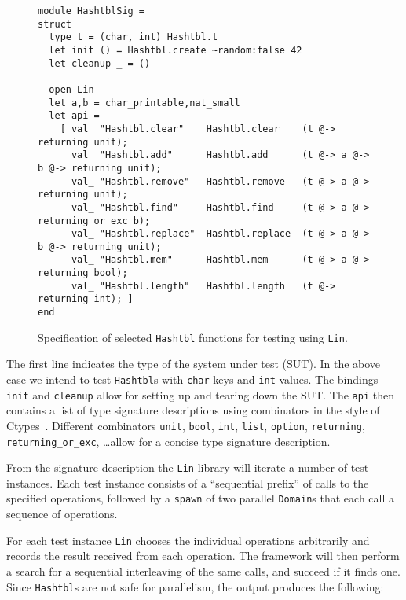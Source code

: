 \documentclass[twocolumn,10pt]{article}
\begin{document}
\begin{figure*}[htb!]
\begin{lstlisting}
module HashtblSig =
struct
  type t = (char, int) Hashtbl.t
  let init () = Hashtbl.create ~random:false 42
  let cleanup _ = ()

  open Lin
  let a,b = char_printable,nat_small
  let api =
    [ val_ "Hashtbl.clear"    Hashtbl.clear    (t @-> returning unit);
      val_ "Hashtbl.add"      Hashtbl.add      (t @-> a @-> b @-> returning unit);
      val_ "Hashtbl.remove"   Hashtbl.remove   (t @-> a @-> returning unit);
      val_ "Hashtbl.find"     Hashtbl.find     (t @-> a @-> returning_or_exc b);
      val_ "Hashtbl.replace"  Hashtbl.replace  (t @-> a @-> b @-> returning unit);
      val_ "Hashtbl.mem"      Hashtbl.mem      (t @-> a @-> returning bool);
      val_ "Hashtbl.length"   Hashtbl.length   (t @-> returning int); ]
end
\end{lstlisting}%
\vspace{-5mm}
\caption{Specification of selected \texttt{Hashtbl} functions for testing using
  \texttt{Lin}.}\label{code:lin}
\vspace{-.7em}%
\end{figure*}

The first line indicates the type of the system under test (SUT). In the
above case we intend to test \texttt{Hashtbl}s with \texttt{char} keys and \texttt{int}
values. The bindings \texttt{init} and \texttt{cleanup} allow for setting up and
tearing down the SUT. The \texttt{api} then contains a list of type signature
descriptions using combinators in the style of Ctypes~\cite{YALLOP201882}. Different
combinators \texttt{unit}, \texttt{bool}, \texttt{int}, \texttt{list}, \texttt{option}, \texttt{returning},
\lstinline|returning_or_exc|, \dots\@ allow for a concise type signature description.

From the signature description the \texttt{Lin} library will iterate a number of
test instances. Each test instance consists of a ``sequential prefix''
of calls to the specified operations, followed by a \texttt{spawn} of two
parallel \texttt{Domain}s that each call a sequence of operations.

For each test instance \texttt{Lin} chooses the individual operations
arbitrarily and records the result received from each operation. The
framework will then perform a search for a sequential interleaving of
the same calls, and succeed if it finds one. Since \texttt{Hashtbl}s are not
safe for parallelism, the output produces the following:
\end{document}
